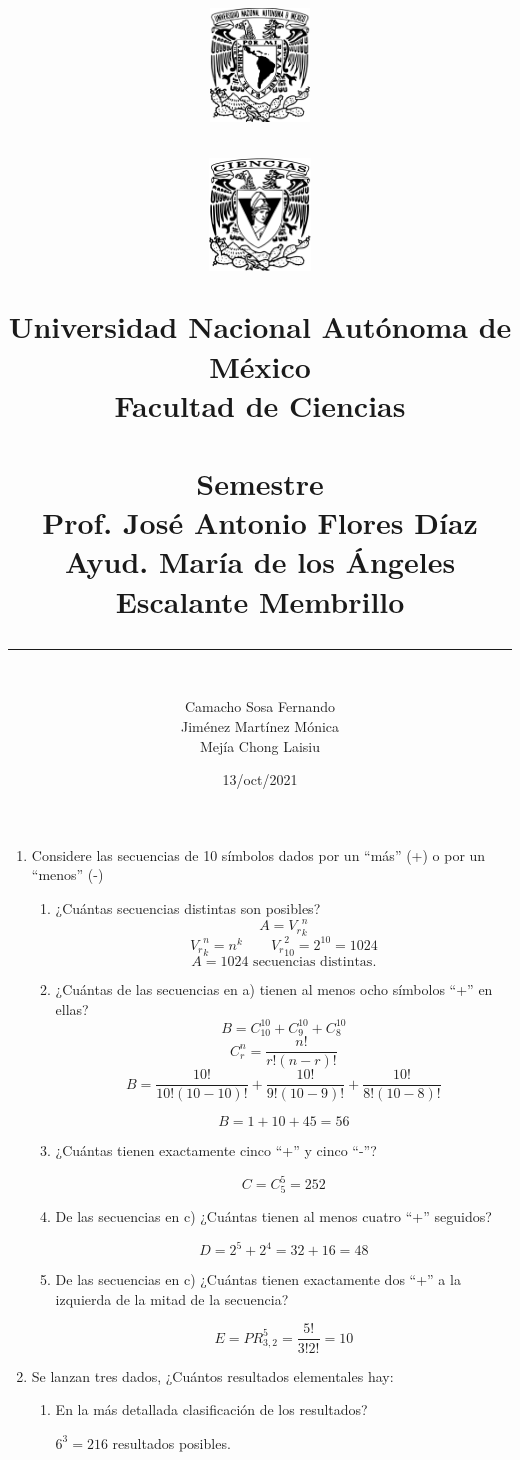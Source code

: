 \documentclass[letterpaper,11pt]{article}
\title{
    \begin{minipage}{0.5\textwidth}%
			\includegraphics[height=3cm, left]{unam.png}%
    \end{minipage}%
    \begin{minipage}{0.5\textwidth}%
			\includegraphics[height=3cm, right]{fciencias.png}%
    \end{minipage}

	\begin{center}
	\vspace{-134pt}
	\textbf{Universidad Nacional Autónoma de México}\\[0.2cm]
	\textbf{Facultad de Ciencias}\\[0.2cm]
	\textbf{\Materia}\\[0.2cm]
	\large \textbf{ Semestre \Semestre }\\[0.2cm]
	Prof. José Antonio Flores Díaz\\ [0.2cm]													%
	Ayud. María de los Ángeles Escalante Membrillo\\ [0.2cm]													%
	\textbf{\TareaX}
	\end{center}
	\vspace{10pt}
	\rule{17cm}{0.3mm}
	\begin{flushright}
	\vspace{-3pt}
	\end{flushright}
}
\author{\vspace{-2cm} \\Camacho Sosa Fernando\\Jiménez Martínez Mónica\\Mejía Chong Laisiu}
\date{13/oct/2021}
\renewcommand{%
	\contentsname}{\vspace{-1cm} \hfill\bfseries\LARGE Índice \hfill \vspace{0.2cm}%
}
\begin{document}
\maketitle

\begin{enumerate}

\item  Considere las secuencias de 10 símbolos dados por un ``más'' (+) o por un ``menos'' (-)

\begin{enumerate}
	\item ¿Cuántas secuencias distintas son posibles?
	$$
	A= {V_r}_k^n
	$$
	$$
	{V_r}_k^n =n^k \qquad {V_r}_{10}^2= 2^{10} = 1024
	$$
	$$
	A= 1024 \text{ secuencias distintas.}
	$$

	\item ¿Cuántas de las secuencias en a) tienen al menos ocho símbolos ``+'' en ellas?
	$$
	B= C_{10}^{10} + C_{9}^{10} + C_{8}^{10}
	$$
	$$
	C^n_r= \frac{n!}{r!(n-r)!}
	$$
	$$
	B= \frac{10!}{10!(10-10)!} + \frac{10!}{9!(10-9)!} + \frac{10!}{8!(10-8)!} 
	$$
	
	$$
	B= 1+10+45 = 56
	$$

	\item ¿Cuántas tienen exactamente cinco ``+'' y cinco ``-''?
	
	$$
	C = C^5_5 = 252
	$$

	\item De las secuencias en c) ¿Cuántas tienen al menos cuatro ``+'' seguidos?
	
	$$
	D = 2^5 + 2^4 = 32 + 16 = 48
	$$

	\item De las secuencias en c) ¿Cuántas tienen exactamente dos ``+'' a la izquierda de la mitad de la secuencia?
	
	$$
	E = PR^5_{3,2} = \frac{5!}{3!2!} = 10
	$$

\end{enumerate}

\item Se lanzan tres dados, ¿Cuántos resultados elementales hay: 
\begin{enumerate}
	\item En la más detallada clasificación de los resultados?
	
	$6^3 = 216$ resultados posibles. 


\end{enumerate}
\end{enumerate}
\end{document}
